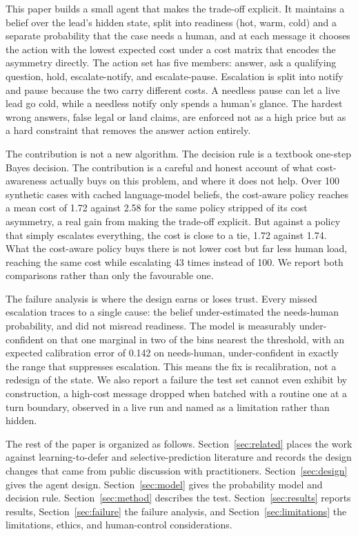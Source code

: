 \documentclass{article}
\begin{document}
This paper builds a small agent that makes the trade-off explicit. It maintains
a belief over the lead's hidden state, split into readiness (hot, warm, cold)
and a separate probability that the case needs a human, and at each message it
chooses the action with the lowest expected cost under a cost matrix that
encodes the asymmetry directly. The action set has five members: answer, ask a
qualifying question, hold, escalate-notify, and escalate-pause. Escalation is
split into notify and pause because the two carry different costs. A needless
pause can let a live lead go cold, while a needless notify only spends a human's
glance. The hardest wrong answers, false legal or land claims, are enforced not
as a high price but as a hard constraint that removes the answer action
entirely.

The contribution is not a new algorithm. The decision rule is a textbook
one-step Bayes decision. The contribution is a careful and honest account of
what cost-awareness actually buys on this problem, and where it does not help.
Over 100 synthetic cases with cached language-model beliefs, the cost-aware
policy reaches a mean cost of 1.72 against 2.58 for the same policy stripped of
its cost asymmetry, a real gain from making the trade-off explicit. But against
a policy that simply escalates everything, the cost is close to a tie, 1.72
against 1.74. What the cost-aware policy buys there is not lower cost but far
less human load, reaching the same cost while escalating 43 times instead of
100. We report both comparisons rather than only the favourable one.

The failure analysis is where the design earns or loses trust. Every missed
escalation traces to a single cause: the belief under-estimated the needs-human
probability, and did not misread readiness. The model is measurably
under-confident on that one marginal in two of the bins nearest the threshold, with an expected calibration error of
0.142 on needs-human, under-confident in exactly the range that suppresses
escalation. This means the fix is recalibration, not a redesign of the state. We
also report a failure the test set cannot even exhibit by construction, a
high-cost message dropped when batched with a routine one at a turn boundary,
observed in a live run and named as a limitation rather than hidden.

The rest of the paper is organized as follows.
Section~\ref{sec:related} places the work against learning-to-defer and
selective-prediction literature and records the design changes that came from
public discussion with practitioners. Section~\ref{sec:design} gives the agent
design. Section~\ref{sec:model} gives the probability model and decision rule.
Section~\ref{sec:method} describes the test. Section~\ref{sec:results} reports
results, Section~\ref{sec:failure} the failure analysis, and
Section~\ref{sec:limitations} the limitations, ethics, and human-control
considerations.
\end{document}
